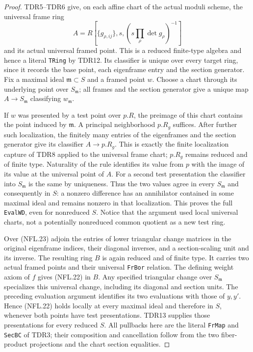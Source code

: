 \begin{proof}
TDR5--TDR6 give, on each affine chart of the actual moduli scheme,
the universal frame ring
\[
 A=R[\{g_{\rho,ij}\},s,
           (s\prod_\rho\det g_\rho)^{-1}]
 \tag{NFL.23}
\]
and its actual universal framed point.  This is a reduced
finite-type algebra and hence a literal \texttt{TRing} by TDR12.
Its classifier is unique over every target ring, since it records
the base point, each eigenframe entry and the section generator.
Fix a maximal ideal $\mathfrak m\subset S$ and a framed point $w$.
Choose a chart through its underlying point over $S_\mathfrak m$;
all frames and the section generator give a unique map
$A\to S_\mathfrak m$ classifying $w_\mathfrak m$.

If $w$ was presented by a test point over $p.R$, the preimage
of this chart contains the point induced by $\mathfrak m$.
A principal neighborhood $p.R_g$ suffices.  After further such
localization, the finitely many entries of the eigenframes and
the section generator give its classifier $A\to p.R_g$.
This is exactly the finite localization capture of TDR8 applied
to the universal frame chart; $p.R_g$ remains reduced and of
finite type.  Naturality of the rule identifies its value from
$p$ with the image of its value at the universal point of $A$.
For a second test presentation the classifier into $S_\mathfrak m$
is the same by uniqueness.  Thus the two values agree in every
$S_\mathfrak m$ and consequently in $S$: a nonzero difference
has an annihilator contained in some maximal ideal and remains
nonzero in that localization.  This proves the full
\texttt{EvalWD}, even for nonreduced $S$.  Notice that the
argument used local universal charts, not a potentially
nonreduced common quotient as a new test ring.

Over (NFL.23) adjoin the entries of lower triangular change
matrices in the original eigenframe indices, their diagonal
inverses, and a section-scaling unit and its inverse.  The resulting
ring $B$ is again reduced and of finite type.  It carries two
actual framed points and their universal \texttt{FrBor} relation.
The defining weight axiom of $f$ gives (NFL.22) in $B$.
Any specified triangular change over $S_\mathfrak m$ specializes
this universal change, including its diagonal and section units.
The preceding evaluation argument identifies its two evaluations
with those of $y,y'$.  Hence (NFL.22) holds locally at every
maximal ideal and therefore in $S$, whenever both points have
test presentations.  TDR13 supplies those presentations for
every reduced $S$.  All pullbacks here are the literal
\texttt{FrMap} and \texttt{SecBC} of TDR3; their composition
and cancellation follow from the two fiber-product projections
and the chart section equalities.
\end{proof}

